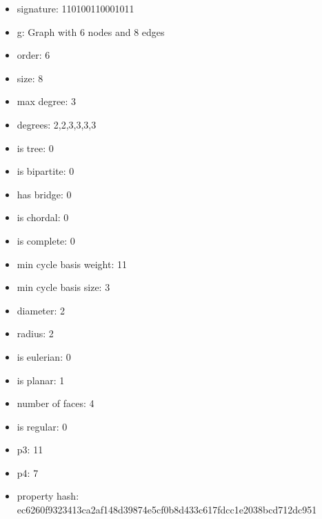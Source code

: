 \begin{itemize}
\item signature: 110100110001011
\item g: Graph with 6 nodes and 8 edges
\item order: 6
\item size: 8
\item max degree: 3
\item degrees: 2,2,3,3,3,3
\item is tree: 0
\item is bipartite: 0
\item has bridge: 0
\item is chordal: 0
\item is complete: 0
\item min cycle basis weight: 11
\item min cycle basis size: 3
\item diameter: 2
\item radius: 2
\item is eulerian: 0
\item is planar: 1
\item number of faces: 4
\item is regular: 0
\item p3: 11
\item p4: 7
\item property hash: ec6260f9323413ca2af148d39874e5cf0b8d433c617fdcc1e2038bcd712dc951
\end{itemize}
\newpage
\begin{figure}
\end{figure}
